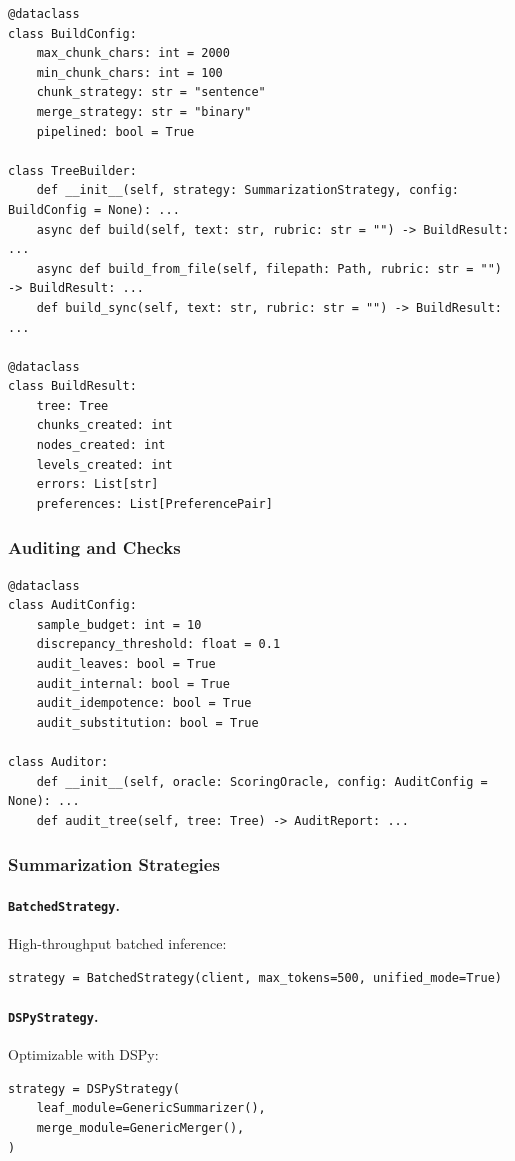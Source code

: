 \begin{lstlisting}
@dataclass
class BuildConfig:
    max_chunk_chars: int = 2000
    min_chunk_chars: int = 100
    chunk_strategy: str = "sentence"
    merge_strategy: str = "binary"
    pipelined: bool = True

class TreeBuilder:
    def __init__(self, strategy: SummarizationStrategy, config: BuildConfig = None): ...
    async def build(self, text: str, rubric: str = "") -> BuildResult: ...
    async def build_from_file(self, filepath: Path, rubric: str = "") -> BuildResult: ...
    def build_sync(self, text: str, rubric: str = "") -> BuildResult: ...

@dataclass
class BuildResult:
    tree: Tree
    chunks_created: int
    nodes_created: int
    levels_created: int
    errors: List[str]
    preferences: List[PreferencePair]
\end{lstlisting}

\subsubsection{Auditing and Checks}

\begin{lstlisting}
@dataclass
class AuditConfig:
    sample_budget: int = 10
    discrepancy_threshold: float = 0.1
    audit_leaves: bool = True
    audit_internal: bool = True
    audit_idempotence: bool = True
    audit_substitution: bool = True

class Auditor:
    def __init__(self, oracle: ScoringOracle, config: AuditConfig = None): ...
    def audit_tree(self, tree: Tree) -> AuditReport: ...
\end{lstlisting}

\subsubsection{Summarization Strategies}

\paragraph{\texttt{BatchedStrategy}.}
High-throughput batched inference:
\begin{lstlisting}
strategy = BatchedStrategy(client, max_tokens=500, unified_mode=True)
\end{lstlisting}

\paragraph{\texttt{DSPyStrategy}.}
Optimizable with DSPy:
\begin{lstlisting}
strategy = DSPyStrategy(
    leaf_module=GenericSummarizer(),
    merge_module=GenericMerger(),
)
\end{lstlisting}

